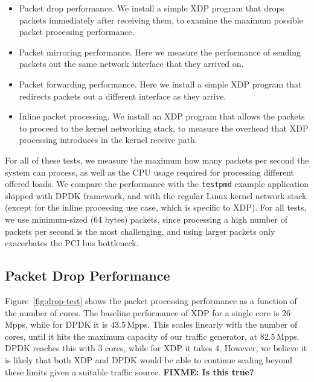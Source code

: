 \documentclass[10pt,sigconf]{acmart}
\begin{document}
\begin{itemize}
\item Packet drop performance. We install a simple XDP program that drops
  packets immediately after receiving them, to examine the maximum possible
  packet processing performance.

\item Packet mirroring performance. Here we measure the performance of sending
  packets out the same network interface that they arrived on.

\item Packet forwarding performance. Here we install a simple XDP program that
  redirects packets out a different interface as they arrive.

\item Inline packet processing. We install an XDP program that allows the
  packets to proceed to the kernel networking stack, to measure the overhead
  that XDP processing introduces in the kernel receive path.
\end{itemize}


For all of these tests, we measure the maximum how many packets per second the
system can process, as well as the CPU usage required for processing different
offered loads. We compare the performance with the \texttt{testpmd} example
application shipped with DPDK framework, and with the regular Linux kernel
network stack (except for the inline processing use case, which is specific to
XDP). For all tests, we use minimum-sized (64 bytes) packets, since processing a
high number of packets per second is the most challenging, and using larger
packets only exacerbates the PCI bus bottleneck.

\subsection{Packet Drop Performance}
\label{sec:basel-pack-proc}
Figure~\ref{fig:drop-test} shows the packet processing performance as a function
of the number of cores. The baseline performance of XDP for a single core is
26\,Mpps, while for DPDK it is 43.5\,Mpps. This scales linearly with the number
of cores, until it hits the maximum capacity of our traffic generator, at
82.5\,Mpps. DPDK reaches this with 3 cores, while for XDP it takes 4. However,
we believe it is likely that both XDP and DPDK would be able to continue scaling
beyond these limits given a suitable traffic source. \textbf{FIXME: Is this
  true?}
\end{document}
